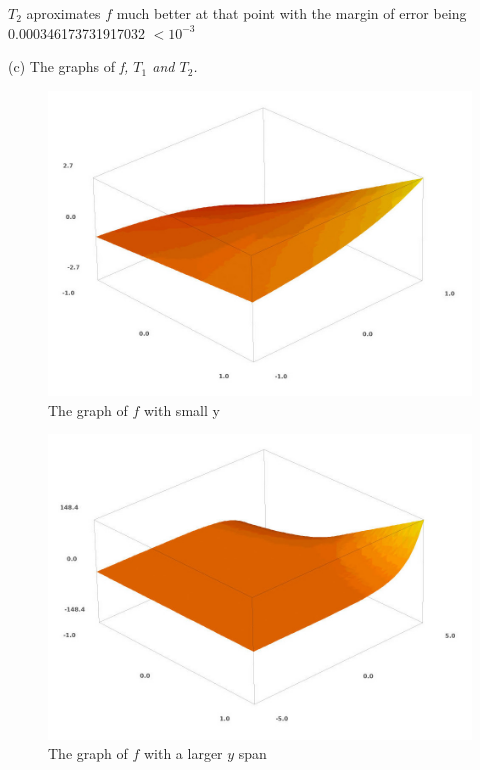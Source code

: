 \documentclass[a4paper,12pt]{article}
\begin{document}
$T_{2}$ aproximates $f$ much better at that point with the
margin of error being 0.000346173731917032 $< 10^{-3}$

\clearpage
(c)
The graphs of \em{f}, \em{$T_{1}$} and \em{$T_{2}$}.
\begin{figure}[H]
    \centering
    \includegraphics[scale=0.33]{3_f_1.jpg}
    \caption{The graph of $f$ with small y}
    \label{3_f_1}
\end{figure}
\begin{figure}[H]
    \centering
    \includegraphics[scale=0.33]{3_f_2.jpg}
    \caption{The graph of $f$ with a larger $y$ span}
    \label{3_f_2}
\end{figure}
\end{document}
